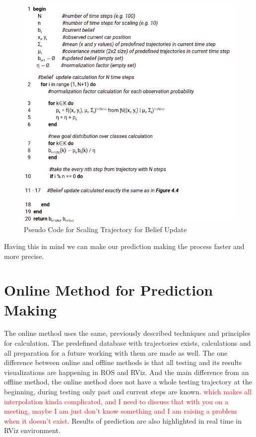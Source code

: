 \begin{figure}[h]
	\centering  	
	\includegraphics[width=13cm]{img/Pseudo4Scalling.jpg}
	\caption{Pseudo Code for Scaling Trajectory for Belief Update}
	\label{fig:PseudoScalling}    
\end{figure}

Having this in mind we can make our prediction making the process faster and more precise. 

\section{Online Method for Prediction Making}

The online method uses the same, previously described techniques and principles for calculation. The predefined database with trajectories exists, calculations and all preparation for a future working with them are made as well. The one difference between online and offline methods is that all testing and its results visualizations are happening in \gls{ROS} and \gls{RViz}. And the main difference from an offline method, the online method does not have a whole testing trajectory at the beginning, during testing only past and current steps are known. \textcolor{red}{which makes all interpolation kinda complicated, and I need to discuss that with you on a meeting, maybe I am just don't know something and I am raising a problem when it doesn't exist}. Results of prediction are also highlighted in real time in \gls{RViz} environment.
